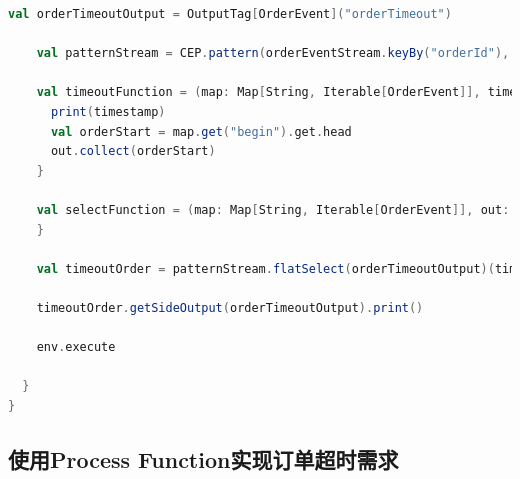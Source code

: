\documentclass[oneside]{ctexbook}
\begin{document}
\begin{lstlisting}[language=scala]
    val orderTimeoutOutput = OutputTag[OrderEvent]("orderTimeout")

    val patternStream = CEP.pattern(orderEventStream.keyBy("orderId"), orderPayPattern)

    val timeoutFunction = (map: Map[String, Iterable[OrderEvent]], timestamp: Long, out: Collector[OrderEvent]) => {
      print(timestamp)
      val orderStart = map.get("begin").get.head
      out.collect(orderStart)
    }

    val selectFunction = (map: Map[String, Iterable[OrderEvent]], out: Collector[OrderEvent]) => {
    }

    val timeoutOrder = patternStream.flatSelect(orderTimeoutOutput)(timeoutFunction)(selectFunction)

    timeoutOrder.getSideOutput(orderTimeoutOutput).print()

    env.execute

  }
}
\end{lstlisting}

\subsection{使用Process Function实现订单超时需求}
\end{document}
